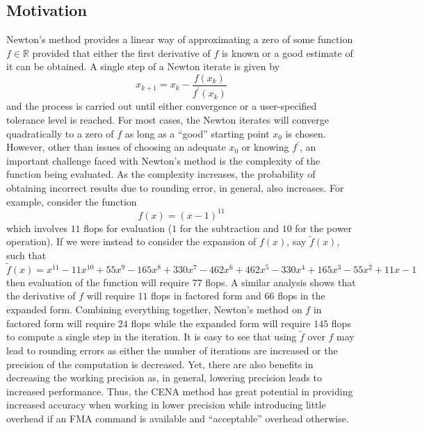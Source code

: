 \documentclass{standalone}
\begin{document}
	\subsection{Motivation}
	Newton's method provides a linear way of approximating a zero of some function $f\in\mathbb{R}$ provided that either the first derivative of $f$ is known or a good estimate of it can be obtained. A single step of a Newton iterate is given by$$x_{k+1}=x_{k}-\frac{f(x_{k})}{f^{\prime}(x_{k})}$$and the process is carried out until either convergence or a user-specified tolerance level is reached. For most cases, the Newton iterates will converge quadratically to a zero of $f$ as long as a ``good'' starting point $x_{0}$ is chosen. However, other than issues of choosing an adequate $x_{0}$ or knowing $f^{\prime}$, an important challenge faced with Newton's method is the complexity of the function being evaluated. As the complexity increases, the probability of obtaining incorrect results due to rounding error, in general, also increases. For example, consider the function$$f(x)=(x-1)^{11}$$which involves $11$ flops for evaluation ($1$ for the subtraction and $10$ for the power operation). If we were instead to consider the expansion of $f(x)$, say $\tilde{f}(x)$, such that$$\tilde{f}(x)=x^{11}-11x^{10}+55x^{9}-165x^{8}+330x^{7}-462x^{6}+462x^{5}-330x^{4}+165 x^{3}-55x^{2}+11x-1$$then evaluation of the function will require $77$ flops. A similar analysis shows that the derivative of $f$ will require $11$ flops in factored form and $66$ flops in the expanded form. Combining everything together, Newton's method on $f$ in factored form will require $24$ flops while the expanded form will require $145$ flops to compute a single step in the iteration. It is easy to see that using $\tilde{f}$ over $f$ may lead to rounding errors as either the number of iterations are increased or the precision of the computation is decreased. Yet, there are also benefits in decreasing the working precision as, in general, lowering precision leads to increased performance. Thus, the CENA method has great potential in providing increased accuracy when working in lower precision while introducing little overhead if an FMA command is available and ``acceptable'' overhead otherwise.
\end{document}
